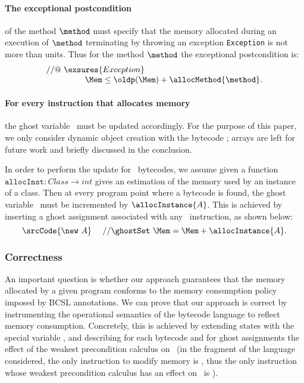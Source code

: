 \paragraph{The exceptional postcondition} of the method $\method$ must
specify that the memory allocated during an execution of $\method$ 
terminating by throwing an exception \texttt{Exception} is not more
than \allocMethod{\method} units. Thus for the method $\method$ the
exceptional postcondition is:
$$
\begin{array}{l}
//@ \ \exsures{Exception} \\
\ \ \ \ \ \ \ \ \ \ \ \ \ \  \Mem \leq \oldp(\Mem) + \allocMethod{\method}.
\end{array}
$$




\paragraph{For every instruction that allocates memory} the ghost
variable \Mem\ must be updated accordingly. For the purpose of
this paper, we only consider dynamic object creation with the 
bytecode \new; arrays are left for future work and briefly discussed 
in the conclusion. 

In order to perform the update for \new\ bytecodes, we assume given a
function $\texttt{allocInst}: Class \rightarrow int$ gives an
estimation of the memory used by an instance of a class. Then at every
program point where a bytecode  is found, the ghost
variable \Mem\ must be incremented by $\allocInstance{A}$. This is
achieved by inserting a ghost assignment associated with any \new\
instruction, as shown below:
$$
\srcCode{\new \ A} \ \ \ \ // \ghostSet \ \Mem = \Mem + \allocInstance{A}.
$$

\subsubsection{Correctness} An important question is whether our approach
guarantees that the memory allocated by a given program conforms to
the memory consumption policy imposed by BCSL annotations. We can
prove that our approach is correct by instrumenting the operational
semantics of the bytecode language to reflect memory
consumption. Concretely, this is achieved by extending states with the
special variable \Mem, and describing for each bytecode and for ghost
assignments the effect of the weakest precondition calculus on \Mem\
(in the fragment of the language considered, the only instruction to
modify memory is \new, thus the only instruction whose weakest
precondition calculus has an effect on \Mem\ is \new).

